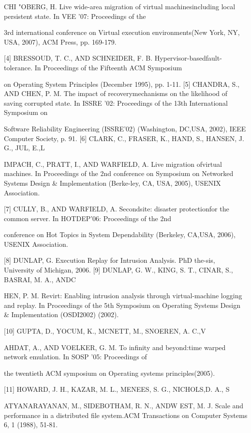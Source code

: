 CHI "OBERG, H. Live wide-area migration of virtual machinesincluding local persistent state. In VEE '07: Proceedings of the

3rd international conference on Virtual execution environments(New York, NY, USA, 2007), ACM Press, pp. 169-179.

[4] BRESSOUD, T. C., AND SCHNEIDER, F. B. Hypervisor-basedfault-tolerance. In Proceedings of the Fifteenth ACM Symposium

on Operating System Principles (December 1995), pp. 1-11.
[5] CHANDRA, S., AND CHEN, P. M. The impact of recoverymechanisms on the likelihood of saving corrupted state. In ISSRE '02: Proceedings of the 13th International Symposium on

Software Reliability Engineering (ISSRE'02) (Washington, DC,USA, 2002), IEEE Computer Society, p. 91.
[6] CLARK, C., FRASER, K., HAND, S., HANSEN, J. G., JUL, E.,L

IMPACH, C., PRATT, I., AND WARFIELD, A. Live migration ofvirtual machines. In Proceedings of the 2nd conference on Symposium on Networked Systems Design & Implementation (Berke-ley, CA, USA, 2005), USENIX Association.

[7] CULLY, B., AND WARFIELD, A. Secondsite: disaster protectionfor the common server. In HOTDEP'06: Proceedings of the 2nd

conference on Hot Topics in System Dependability (Berkeley, CA,USA, 2006), USENIX Association.

[8] DUNLAP, G. Execution Replay for Intrusion Analysis. PhD the-sis, University of Michigan, 2006.
[9] DUNLAP, G. W., KING, S. T., CINAR, S., BASRAI, M. A., ANDC

HEN, P. M. Revirt: Enabling intrusion analysis through virtual-machine logging and replay. In Proceedings of the 5th Symposium on Operating Systems Design & Implementation (OSDI2002) (2002).

[10] GUPTA, D., YOCUM, K., MCNETT, M., SNOEREN, A. C.,V

AHDAT, A., AND VOELKER, G. M. To infinity and beyond:time warped network emulation. In SOSP '05: Proceedings of

the twentieth ACM symposium on Operating systems principles(2005).

[11] HOWARD, J. H., KAZAR, M. L., MENEES, S. G., NICHOLS,D. A., S

ATYANARAYANAN, M., SIDEBOTHAM, R. N., ANDW
EST, M. J. Scale and performance in a distributed file system.ACM Transactions on Computer Systems 6, 1 (1988), 51-81.

